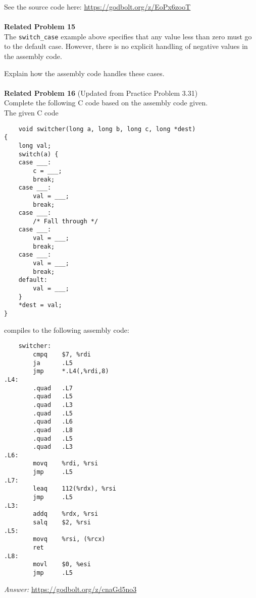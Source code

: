 See the source code here: \url{https://godbolt.org/z/EoPx6zooT} \\
\\
\clearpage
\noindent\textbf{Related Problem 15} \\
The \texttt{switch\_case} example above specifies that any value less than zero must go to the default case. However, there is no explicit handling of negative values in the assembly code. 

Explain how the assembly code handles these cases.\\ 
\\
\noindent\textbf{Related Problem 16} (Updated from Practice Problem 3.31) \\
Complete the following C code based on the assembly code given.\\
The given C code
\begin{verbatim}
    void switcher(long a, long b, long c, long *dest)
{
    long val;
    switch(a) {
    case ___:
        c = ___;
        break;
    case ___:
        val = ___;
        break;
    case ___:
        /* Fall through */
    case ___:
        val = ___;
        break;
    case ___:
        val = ___;
        break;
    default:
        val = ___; 
    }
    *dest = val; 
}
\end{verbatim}
compiles to the following assembly code:
\begin{verbatim}
    switcher:
        cmpq    $7, %rdi
        ja      .L5
        jmp     *.L4(,%rdi,8)
.L4:
        .quad   .L7
        .quad   .L5
        .quad   .L3
        .quad   .L5
        .quad   .L6
        .quad   .L8
        .quad   .L5
        .quad   .L3
.L6:
        movq    %rdi, %rsi
        jmp     .L5
.L7:
        leaq    112(%rdx), %rsi
        jmp     .L5
.L3:
        addq    %rdx, %rsi
        salq    $2, %rsi
.L5:
        movq    %rsi, (%rcx)
        ret
.L8:
        movl    $0, %esi
        jmp     .L5
\end{verbatim}

\textit{Answer: }\url{https://godbolt.org/z/cnaGd5no3}
\clearpage